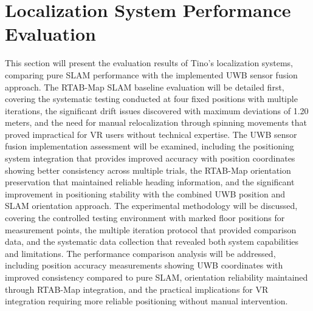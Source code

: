 \section{Localization System Performance Evaluation}
This section will present the evaluation results of Tino's localization systems, comparing pure SLAM performance with the implemented UWB sensor fusion approach. The RTAB-Map SLAM baseline evaluation will be detailed first, covering the systematic testing conducted at four fixed positions with multiple iterations, the significant drift issues discovered with maximum deviations of 1.20 meters, and the need for manual relocalization through spinning movements that proved impractical for VR users without technical expertise. The UWB sensor fusion implementation assessment will be examined, including the positioning system integration that provides improved accuracy with position coordinates showing better consistency across multiple trials, the RTAB-Map orientation preservation that maintained reliable heading information, and the significant improvement in positioning stability with the combined UWB position and SLAM orientation approach. The experimental methodology will be discussed, covering the controlled testing environment with marked floor positions for measurement points, the multiple iteration protocol that provided comparison data, and the systematic data collection that revealed both system capabilities and limitations. The performance comparison analysis will be addressed, including position accuracy measurements showing UWB coordinates with improved consistency compared to pure SLAM, orientation reliability maintained through RTAB-Map integration, and the practical implications for VR integration requiring more reliable positioning without manual intervention.

